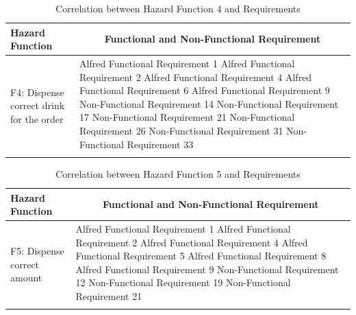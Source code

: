 \documentclass [10pt]{article}
\begin{document}
\begin{longtable}{| p{ } | p{ } |}
\hline 
\centering \textbf{Hazard Function} & 
\multicolumn{1}{c}{\textbf {Functional and Non-Functional Requirement}}\\ \hline
\multirow{9}{*}{F4: Dispense correct drink for the order} & 
		{Alfred Functional Requirement 1 \newline
		Alfred Functional Requirement 2 \newline
		Alfred Functional Requirement 4 \newline
		Alfred Functional Requirement 6 \newline
		Alfred Functional Requirement 9 \newline
		Non-Functional Requirement 14 \newline
		Non-Functional Requirement 17 \newline
		Non-Functional Requirement 21 \newline
		Non-Functional Requirement 26 \newline
		Non-Functional Requirement 31 \newline
		Non-Functional Requirement 33} \\
\hline 
\caption{Correlation between Hazard Function 4 and Requirements}  
\end{longtable}

\pagebreak



\begin{longtable}{| p{ } | p{ } |}
\hline 
\centering \textbf{Hazard Function} & 
\multicolumn{1}{c}{\textbf {Functional and Non-Functional Requirement}}\\ \hline
\multirow{7}{*}{F5: Dispense correct amount} & 
		{Alfred Functional Requirement 1 \newline
		Alfred Functional Requirement 2 \newline
		Alfred Functional Requirement 4 \newline
		Alfred Functional Requirement 5 \newline
		Alfred Functional Requirement 8 \newline
		Alfred Functional Requirement 9 \newline
		Non-Functional Requirement 12 \newline
		Non-Functional Requirement 19 \newline
		Non-Functional Requirement 21} \\ 
\hline 
\caption{Correlation between Hazard Function 5 and Requirements}  
\end{longtable}
\end{document}
